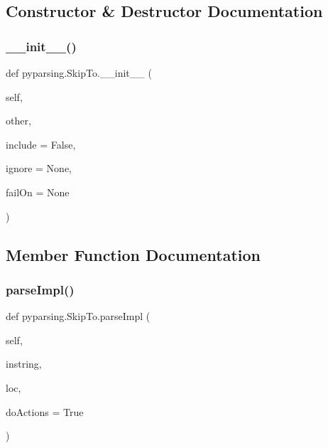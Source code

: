 \subsection{Constructor \& Destructor Documentation}
\mbox{\label{classpyparsing_1_1SkipTo_a2b9335c3694c26bf610e029a47455f13}} 
\subsubsection{\texorpdfstring{\+\_\+\+\_\+init\+\_\+\+\_\+()}{\_\_init\_\_()}}
{\footnotesize\ttfamily def pyparsing.\+Skip\+To.\+\_\+\+\_\+init\+\_\+\+\_\+ (\begin{DoxyParamCaption}\item[{}]{self,  }\item[{}]{other,  }\item[{}]{include = {\ttfamily False},  }\item[{}]{ignore = {\ttfamily None},  }\item[{}]{fail\+On = {\ttfamily None} }\end{DoxyParamCaption})}



\subsection{Member Function Documentation}
\mbox{\label{classpyparsing_1_1SkipTo_affb6cec655458cb1406ab9ae384dda5d}} 
\subsubsection{\texorpdfstring{parse\+Impl()}{parseImpl()}}
{\footnotesize\ttfamily def pyparsing.\+Skip\+To.\+parse\+Impl (\begin{DoxyParamCaption}\item[{}]{self,  }\item[{}]{instring,  }\item[{}]{loc,  }\item[{}]{do\+Actions = {\ttfamily True} }\end{DoxyParamCaption})}



